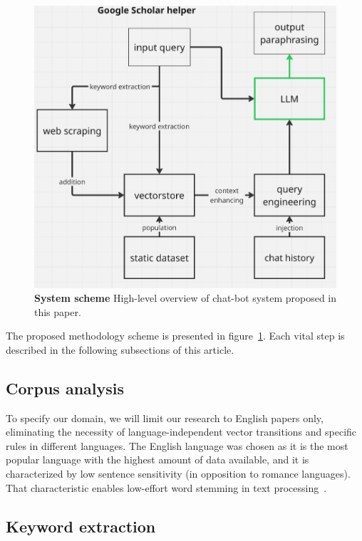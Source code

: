 \documentclass[fleqn,moreauthors,10pt]{ds_report}
\begin{document}
\begin{figure}[ht]\centering 
	\includegraphics[width=\linewidth]{images/scheme.png}
	\caption{\textbf{System scheme} High-level overview of chat-bot system proposed in this paper.}
	\label{fig:scheme}
\end{figure}

The proposed methodology scheme is presented in figure~\ref{fig:scheme}. Each vital step is described in the following subsections of this article.

\subsection*{Corpus analysis}

To specify our domain, we will limit our research to English papers only, eliminating the necessity of language-independent vector transitions and specific rules in different languages. The English language was chosen as it is the most popular language with the highest amount of data available, and it is characterized by low sentence sensitivity (in opposition to romance languages). That characteristic enables low-effort word stemming in text processing~\cite{turney2000learning}.

\subsection*{Keyword extraction}
\end{document}
